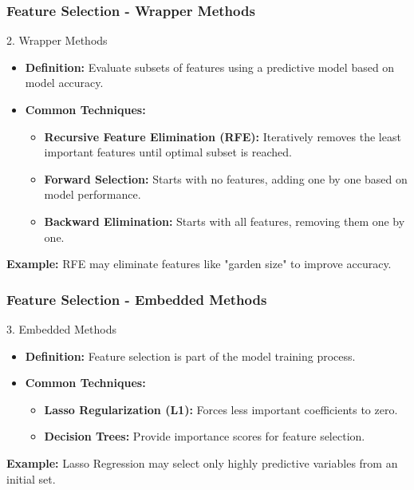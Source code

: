 \documentclass[aspectratio=169]{beamer}
\begin{document}
\begin{frame}[fragile]
    \frametitle{Feature Selection - Wrapper Methods}
    \begin{block}{2. Wrapper Methods}
        \begin{itemize}
            \item \textbf{Definition:} Evaluate subsets of features using a predictive model based on model accuracy.
            \item \textbf{Common Techniques:}
            \begin{itemize}
                \item \textbf{Recursive Feature Elimination (RFE):} Iteratively removes the least important features until optimal subset is reached.
                \item \textbf{Forward Selection:} Starts with no features, adding one by one based on model performance.
                \item \textbf{Backward Elimination:} Starts with all features, removing them one by one.
            \end{itemize}
        \end{itemize}
        \textbf{Example:} RFE may eliminate features like "garden size" to improve accuracy.
    \end{block}
\end{frame}

\begin{frame}[fragile]
    \frametitle{Feature Selection - Embedded Methods}
    \begin{block}{3. Embedded Methods}
        \begin{itemize}
            \item \textbf{Definition:} Feature selection is part of the model training process.
            \item \textbf{Common Techniques:}
            \begin{itemize}
                \item \textbf{Lasso Regularization (L1):} Forces less important coefficients to zero.
                \item \textbf{Decision Trees:} Provide importance scores for feature selection.
            \end{itemize}
        \end{itemize}
        \textbf{Example:} Lasso Regression may select only highly predictive variables from an initial set.
    \end{block}
\end{frame}
\end{document}
